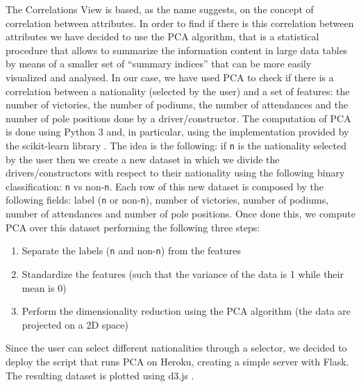 \documentclass[11pt,twocolumn,letterpaper]{article}
\begin{document}
The Correlations View is based, as the name suggests, on the concept of correlation between attributes. In order to find if there is this correlation between attributes we have decided to use the PCA algorithm, that is a statistical procedure that allows to summarize the information content in large data tables by means of a smaller set of “summary indices” that can be more easily visualized and analysed. In our case, we have used PCA to check if there is a correlation between a nationality (selected by the user) and a set of features: the number of victories, the number of podiums, the number of attendances and the number of pole positions done by a driver/constructor. The computation of PCA is done using Python 3 and, in particular, using the implementation provided by the scikit-learn library \cite{Scikit-learn}. The idea is the following: if \texttt{n} is the nationality selected by the user then we create a new dataset in which we divide the drivers/constructors with respect to their nationality using the following binary classification: \texttt{n} vs non-\texttt{n}. Each row of this new dataset is composed by the following fields: label (\texttt{n} or non-\texttt{n}), number of victories, number of podiums, number of attendances and number of pole positions. Once done this, we compute PCA over this dataset performing the following three steps:
\begin{enumerate}
	\item Separate the labels (\texttt{n} and non-\texttt{n}) from the features
	\item Standardize the features (such that the variance of the data is 1 while their mean is 0)
	\item Perform the dimensionality reduction using the PCA algorithm (the data are projected on a 2D space)
\end{enumerate}
Since the user can select different nationalities through a selector, we decided to deploy the script that runs PCA on Heroku\cite{Heroku}, creating a simple server with Flask\cite{Flask}. The resulting dataset is plotted using d3.js \cite{D3}.\\
\end{document}
